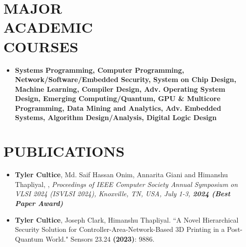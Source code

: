 \documentclass[line,margin,9pt]{res}
\begin{document}
\begin{resume}
\begin{itemize}

\end{itemize}

\section{MAJOR\\ACADEMIC\\COURSES}
\begin{itemize}
\item \bf Systems Programming,
\bf Computer Programming,
\bf Network/Software/Embedded Security,
\bf System on Chip Design,
\bf Machine Learning,
\bf Compiler Design,
\bf Adv. Operating System Design,
\bf Emerging Computing/Quantum,
\bf GPU \& Multicore Programming,
\bf Data Mining and Analytics,
\bf Adv. Embedded Systems,
\bf Algorithm Design/Analysis,
\bf Digital Logic Design
\end{itemize}

\section{PUBLICATIONS}
\begin{itemize}

\item\textbf{Tyler Cultice}, Md. Saif Hassan Onim, Annarita Giani and Himanshu Thapliyal, , \textit{Proceedings of IEEE Computer Society Annual Symposium on VLSI 2024 (ISVLSI 2024), Knoxville, TN, USA, July 1-3, \textbf{2024 (Best Paper Award)}}

\item \textbf{Tyler Cultice}, Joseph Clark, Himanshu Thapliyal. ``A Novel Hierarchical Security Solution for Controller-Area-Network-Based 3D Printing in a Post-Quantum World." Sensors 23.24 \textbf{(2023)}: 9886.


\end{itemize}
\end{resume}
\end{document}
